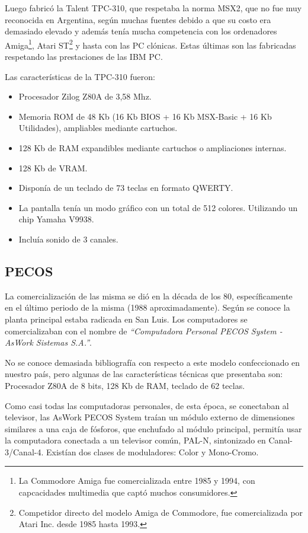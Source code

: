 \documentclass[%
 	final,
%
	notitlepage,
	narroweqnarray,
	inline,
 	twoside,
	]{ieee}
\begin{document}
Luego fabric\'o la Talent TPC-310, que respetaba la norma MSX2, que no fue muy reconocida en Argentina, seg\'un muchas fuentes debido a que su costo era demasiado elevado y adem\'as ten\'ia mucha competencia con los ordenadores Amiga\footnote{La Commodore Amiga fue comercializada entre 1985 y 1994, con capcacidades multimedia que capt\'o muchos consumidores\cite{amiga}.}, Atari ST\footnote{Competidor directo del modelo Amiga de Commodore, fue comercializada por Atari Inc. desde 1985 hasta 1993\cite{atari}.} y hasta con las PC cl\'onicas. Estas \'ultimas son las fabricadas respetando las prestaciones de las IBM PC.

Las caracter\'isticas de la TPC-310 fueron:\\

\begin{itemize}
\item Procesador Zilog Z80A de 3,58 Mhz.
\item Memoria ROM de 48 Kb (16 Kb BIOS + 16 Kb MSX-Basic + 16 Kb Utilidades), ampliables mediante cartuchos.
\item 128 Kb de RAM expandibles mediante cartuchos o ampliaciones internas.
\item 128 Kb de VRAM.
\item Dispon\'ia de un teclado de 73 teclas en formato QWERTY.
\item La pantalla ten\'ia un modo gr\'afico con un total de 512 colores. Utilizando un chip Yamaha V9938.
\item Inclu\'ia sonido de 3 canales.
\end{itemize}

\subsection*{PECOS}

La comercializaci\'on de las misma se di\'o en la d\'ecada de los 80, espec\'ificamente en el \'ultimo periodo de la misma (1988 aproximadamente). Seg\'un se conoce la planta principal estaba radicada en San Luis. Los computadores se comercializaban con el nombre de \textit{``Computadora Personal PECOS System - AsWork Sistemas S.A.''}.

No se conoce demasiada bibliograf\'ia con respecto a este modelo confeccionado en nuestro pa\'is, pero algunas de las  caracter\'isticas t\'ecnicas que presentaba son: Procesador Z80A  de 8 bits, 128 Kb de RAM, teclado de 62 teclas. 

Como casi todas las computadoras personales, de esta \'epoca, se conectaban al televisor, las AsWork PECOS System tra\'ian un m\'odulo externo de dimensiones similares a una caja de f\'osforos, que enchufado al m\'odulo principal, permit\'ia usar la computadora conectada a un televisor com\'un, PAL-N, sintonizado en Canal-3/Canal-4. Exist\'ian dos clases de moduladores: Color y Mono-Cromo. 
\end{document}
